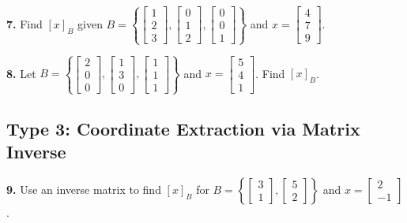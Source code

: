 \documentclass{article}
\begin{document}
\vspace{0.2cm}
\textbf{7.} Find $[x]_B$ given $B = \left\{ \begin{bmatrix} 1 \\ 2 \\ 3 \end{bmatrix}, \begin{bmatrix} 0 \\ 1 \\ 2 \end{bmatrix}, \begin{bmatrix} 0 \\ 0 \\ 1 \end{bmatrix} \right\}$ and $x = \begin{bmatrix} 4 \\ 7 \\ 9 \end{bmatrix}$.

\vspace{0.2cm}
\textbf{8.} Let $B = \left\{ \begin{bmatrix} 2 \\ 0 \\ 0 \end{bmatrix}, \begin{bmatrix} 1 \\ 3 \\ 0 \end{bmatrix}, \begin{bmatrix} 1 \\ 1 \\ 1 \end{bmatrix} \right\}$ and $x = \begin{bmatrix} 5 \\ 4 \\ 1 \end{bmatrix}$. Find $[x]_B$.

\subsection*{Type 3: Coordinate Extraction via Matrix Inverse}
\textbf{9.} Use an inverse matrix to find $[x]_B$ for $B = \left\{ \begin{bmatrix} 3 \\ 1 \end{bmatrix}, \begin{bmatrix} 5 \\ 2 \end{bmatrix} \right\}$ and $x = \begin{bmatrix} 2 \\ -1 \end{bmatrix}$.
\end{document}
